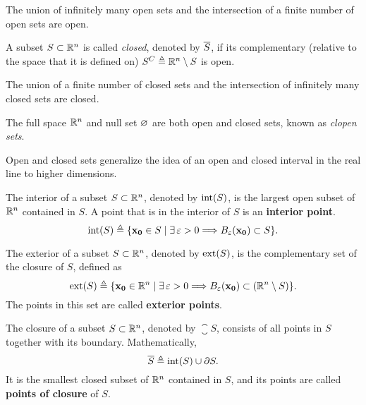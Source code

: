 \begin{prop}
The union of infinitely many open sets and the intersection of a finite number of open sets are open.
\end{prop}

\begin{defn}
	A subset $S\subset\Rtn$ is called \textit{closed}, denoted by $\overline{S}$, if its complementary (relative to the space that it is defined on) $S^C \bydef\Rtn\setminus S$ is open. 
\end{defn}

\begin{prop}
The union of a finite number of closed sets and the intersection of infinitely many closed sets are closed.
\end{prop}

\begin{prop}
	The full space $\Rtn$ and null set $\O$ are both open and closed sets, known as \textit{clopen sets}.
\end{prop}

Open and closed sets generalize the idea of an open and closed interval in the real line to higher dimensions.

\begin{defn}[Interior]
	The interior of a subset $S\subset\Rtn$, denoted by $\interior{S}$, is the largest open subset of $\Rtn$ contained in $S$. 
	A point that is in the interior of $S$ is an \textbf{interior point}.
	\begin{equation}
		\interior{S}\bydef\{\vec{x_0}\in S\st\exists\epsilon > 0\implies B_\epsilon\argopen(\vec{x_0}\argclose)\subset S\}.
	\end{equation}
\end{defn}

\begin{defn}[Exterior]
	The exterior of a subset $S\subset\Rtn$, denoted by $\exterior{S}$, is the complementary set of the closure of $S$, defined as
	\begin{equation}
		\exterior{S}\bydef\{\vec{x_0}\in\Rtn\st\exists\epsilon > 0\implies B_\epsilon\argopen(\vec{x_0}\argclose)\subset
		\left(\Rtn\setminus S\right)\}.
	\end{equation}
	The points in this set are called \textbf{exterior points}.
\end{defn}

\begin{defn}[Closure]
	The closure of a subset $S\subset\Rtn$, denoted by $\closure{S}$, consists of all points in $S$ together with its boundary.
	Mathematically, 
	\begin{equation}
		\closure{S}\bydef\interior{S}\cup\frontier{S}.
	\end{equation}
	It is the smallest closed subset of $\Rtn$ contained in $S$, and its points are called \textbf{points of closure} of $S$.
\end{defn}

